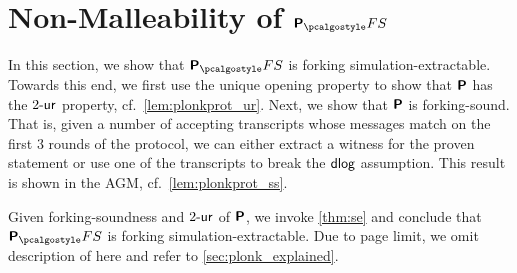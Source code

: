 

\section{Non-Malleability of $\plonkprotfs$} 
\label{sec:plonk}
In this section, we show that $\plonkprotfs$ is forking simulation-extractable. Towards this end, we first use the unique opening property to show that
$\bm{\mathsf{P}}$ has the ${2\text{-}\mathsf{ur}}$ property,
cf.~\cref{lem:plonkprot_ur}.
Next, we show that $\bm{\mathsf{P}}$ is forking-sound. That is, given a
number of accepting transcripts whose messages match on the first $3$ rounds of the
protocol, we can either extract a witness for the proven statement or use
one of the transcripts to break the $\mathsf{dlog}$ assumption. This result is shown in
the AGM, cf.~\cref{lem:plonkprot_ss}.


Given forking-soundness and ${2\text{-}\mathsf{ur}}$ of $\bm{\mathsf{P}}$, we invoke \cref{thm:se} and conclude that $\plonkprot_\fs$ is forking simulation-extractable.
Due to page limit, we omit description of \plonk{} here and refer to
\cref{sec:plonk_explained}. 

 
